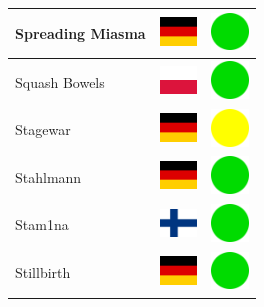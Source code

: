 \documentclass[12pt, a4paper, twoside]{report}
\begin{document}
\begin{center}
\begin{longtable}{|p{5cm}|p{2cm}|p{2cm}|}
 Spreading Miasma                                           & \includegraphics[width=1cm]{../4x3/de} &   \includegraphics[width=1cm]{../likes/y} \\ \hline
 Squash Bowels                                              & \includegraphics[width=1cm]{../4x3/pl} &   \includegraphics[width=1cm]{../likes/y} \\ \hline
 Stagewar                                                   & \includegraphics[width=1cm]{../4x3/de} &   \includegraphics[width=1cm]{../likes/m} \\ \hline
 Stahlmann                                                  & \includegraphics[width=1cm]{../4x3/de} &   \includegraphics[width=1cm]{../likes/y} \\ \hline
 Stam1na                                                    & \includegraphics[width=1cm]{../4x3/fi} &   \includegraphics[width=1cm]{../likes/y} \\ \hline
 Stillbirth                                                 & \includegraphics[width=1cm]{../4x3/de} &   \includegraphics[width=1cm]{../likes/y} \\ \hline

\end{longtable}
\end{center}
\end{document}
